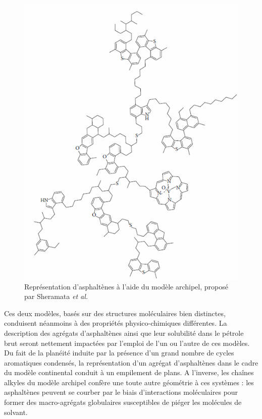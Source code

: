 	\begin{figure}
		\centering
		\includegraphics[scale=0.8]{image/Sher}
		\caption[Molecule d'asphaltènes type archipel]{Représentation d'asphaltènes à l'aide du modèle archipel, proposé par Sheramata \textit{et al.}}
		\label{fig2}
	\end{figure}
	
	Ces deux modèles, basés sur des structures moléculaires bien distinctes, conduisent néanmoins à des propriétés physico-chimiques différentes. La description des agrégats d'asphaltènes ainsi que leur solubilité dans le pétrole brut seront nettement impactées par l'emploi de l'un ou l'autre de ces modèles. Du fait de la planéité induite par la présence d'un grand nombre de cycles aromatiques condensés, la représentation d'un agrégat d'asphaltènes dans le cadre du modèle continental conduit à un empilement de plans. A l'inverse, les chaînes alkyles du modèle archipel confère une toute autre géométrie à ces systèmes : les asphaltènes peuvent se courber par le biais d'interactions moléculaires pour former des macro-agrégats globulaires susceptibles de piéger les molécules de solvant. 
	

